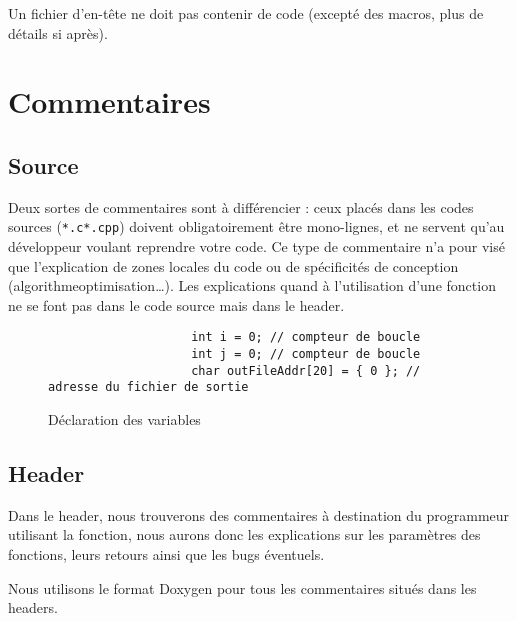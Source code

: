 			Un fichier d'en-tête ne doit pas contenir de code (excepté des macros, plus de détails si après).

	\section{Commentaires}
		\subsection{Source}
			Deux sortes de commentaires sont à différencier : ceux placés dans les codes sources (\verb+*.c+\/\verb+*.cpp+) doivent obligatoirement être mono-lignes, et ne servent qu'au développeur voulant reprendre votre code. Ce type de commentaire n'a pour visé que l'explication de zones locales du code ou de spécificités de conception (algorithme\/optimisation\/\dots). Les explications quand à l'utilisation d'une fonction ne se font pas dans le code source mais dans le header.

			\begin{figure}[H]
				\begin{changemargin}{-2.5cm}{-2.5cm}
				\begin{tcolorbox}
				\begin{verbatim}
					int i = 0; // compteur de boucle
					int j = 0; // compteur de boucle
					char outFileAddr[20] = { 0 }; // adresse du fichier de sortie
				\end{verbatim}
				\end{tcolorbox}
				\end{changemargin}
				\caption{Déclaration des variables}
			\end{figure}
			
		\subsection{Header}
			Dans le header, nous trouverons des commentaires à destination du programmeur utilisant la fonction, nous aurons donc les explications sur les paramètres des fonctions, leurs retours ainsi que les bugs éventuels.

			Nous utilisons le format Doxygen pour tous les commentaires situés dans les headers.

